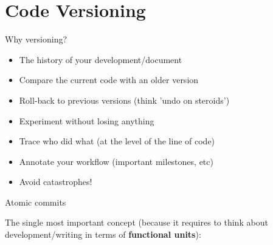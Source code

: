 \documentclass[compress]{beamer}
\begin{document}
\section{Code Versioning}

\begin{frame}{Why versioning?}

    \begin{itemize}
        \item The history of your development/document
        \item Compare the current code with an older version
        \item Roll-back to previous versions (think 'undo on steroids')
        \item Experiment without losing anything
        \item Trace who did what (at the level of the line of code)
        \item Annotate your workflow (important milestones, etc)
        \item Avoid catastrophes!
    \end{itemize}
\end{frame}

\begin{frame}{Atomic commits}

    The single most important concept (because it requires to think about
    development/writing in terms of {\bf functional units}):



\end{frame}
\end{document}
